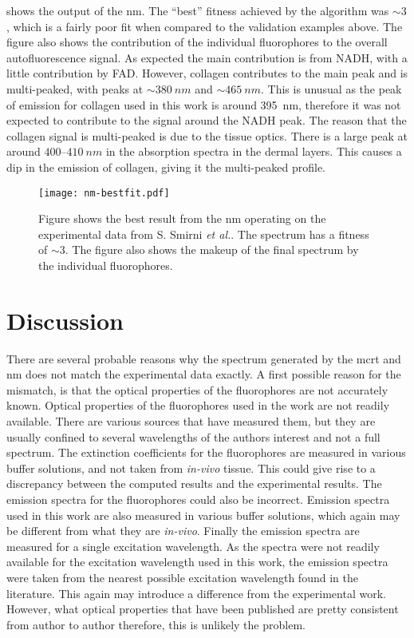  shows the output of the \gls*{nm}.
The ``best'' fitness achieved by the algorithm was $\sim3$, which is a fairly poor fit when compared to the validation examples above.
The figure also shows the contribution of the individual fluorophores to the overall autofluorescence signal.
As expected the main contribution is from NADH, with a little contribution by FAD\@.
However, collagen contributes to the main peak and is multi-peaked, with peaks at $\sim380~nm$ and $\sim 465~nm$.
This is unusual as the peak of emission for collagen used in this work is around 395~nm, therefore it was not expected to contribute to the signal around the NADH peak.
The reason that the collagen signal is multi-peaked is due to the tissue optics.
There is a large peak at around $400$--$410~nm$ in the absorption spectra in the dermal layers.
This causes a dip in the emission of collagen, giving it the multi-peaked profile.

\begin{figure}[!htpb]
  \centering
  \texttt{[image: nm-bestfit.pdf]}
  \caption{Figure shows the best result from the \gls*{nm} operating on the experimental data from S. Smirni \textit{et al.}. The spectrum has a fitness of $\sim 3$. The figure also shows the makeup of the final spectrum by the individual fluorophores.}
  \label{fig:bestNMresult}
\end{figure}

\section{Discussion}

There are several probable reasons why the spectrum generated by the \gls*{mcrt} and \gls*{nm} does not match the experimental data exactly.
A first possible reason for the mismatch, is that the optical properties of the fluorophores are not accurately known.
Optical properties of the fluorophores used in the work are not readily available.
There are various sources that have measured them, but they are usually confined to several wavelengths of the authors interest and not a full spectrum.
The extinction coefficients for the fluorophores are measured in various buffer solutions, and not taken from \textit{in-vivo} tissue.
This could give rise to a discrepancy between the computed results and the experimental results.
The emission spectra for the fluorophores could also be incorrect.
Emission spectra used in this work are also measured in various buffer solutions, which again may be different from what they are \textit{in-vivo}.
Finally the emission spectra are measured for a single excitation wavelength.
As the spectra were not readily available for the excitation wavelength used in this work, the emission spectra were taken from the nearest possible excitation wavelength found in the literature. This again may introduce a difference from the experimental work.
However, what optical properties that have been published are pretty consistent from author to author therefore, this is unlikely the problem.

